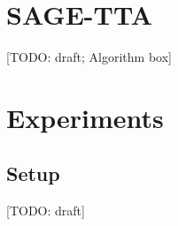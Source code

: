 \documentclass[10pt,twocolumn,letterpaper]{article}
\newcommand{\todo}[1]{{\color{red}[TODO: #1]}}
\begin{document}
\section{SAGE-TTA}
\label{sec:method}
\todo{draft; Algorithm box}

\section{Experiments}
\label{sec:exp}
\subsection{Setup}
\todo{draft}
\end{document}
